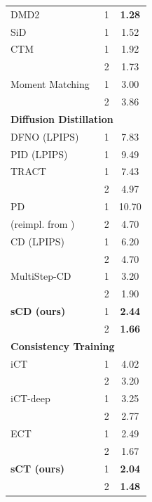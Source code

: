 \begin{table}[t]
\begin{minipage}{0.45\textwidth}
{\begin{tabular}{lcc}
DMD2~\citep{yin2024dmd2} & 1 & \textbf{1.28} \\
SiD~\citep{zhou2024SiD} & 1 & 1.52 \\
CTM~\citep{kim2023ctm} & 1 & 1.92 \\
& 2 & 1.73 \\
Moment Matching~\citep{salimans2024multistepmoment} & 1 & 3.00 \\
& 2 & 3.86 \\
\midrule
\multicolumn{3}{l}{\textbf{Diffusion Distillation}} \\
\midrule
DFNO (LPIPS)~\citep{zheng2023dfno} & 1 & 7.83 \\
PID (LPIPS)~\citep{tee2024PID} & 1 & 9.49 \\
TRACT~\citep{berthelot2023tract} & 1 & 7.43 \\
& 2 & 4.97 \\
PD~\citep{salimans2022progressive} & 1 & 10.70 \\
\quad\quad (reimpl. from \citet{heek2024multistepcm}) & 2 & 4.70 \\
CD (LPIPS)~\citep{song2023cm} & 1 & 6.20 \\
& 2 & 4.70 \\
MultiStep-CD~\citep{heek2024multistepcm} & 1 & 3.20 \\
& 2 & 1.90 \\
\textbf{sCD (ours)} & 1 & \textbf{2.44} \\
& 2 & \textbf{1.66} \\
\midrule
\multicolumn{3}{l}{\textbf{Consistency Training}} \\
\midrule
iCT~\citep{song2023ict} & 1 & 4.02 \\
& 2 & 3.20 \\
iCT-deep~\citep{song2023ict} & 1 & 3.25 \\
& 2 & 2.77 \\
ECT~\citep{geng2024ect} & 1 & 2.49 \\
& 2 & 1.67 \\
\textbf{sCT (ours)} & 1 & \textbf{2.04} \\
& 2 & \textbf{1.48} \\
\bottomrule
\end{tabular} %
}
\end{minipage}
\vspace{-.2in}
\end{table}







